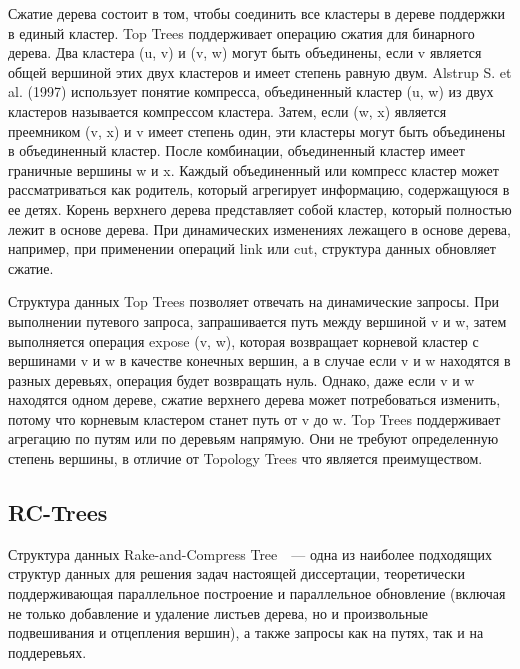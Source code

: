 \documentclass[specification,annotation]{itmo-student-thesis}
\begin{document}
Сжатие дерева состоит в том, чтобы соединить все кластеры в дереве поддержки в единый кластер. Top Trees поддерживает операцию сжатия для бинарного дерева. 
Два кластера (u, v) и (v, w) могут быть объединены, если v является общей вершиной этих двух кластеров и имеет степень равную двум. Alstrup S. et al. (1997) 
использует понятие компресса, объединенный кластер (u, w) из двух кластеров называется компрессом кластера. Затем, если (w, x) является преемником (v, x) и v 
имеет степень один, эти кластеры могут быть объединены в объединенный кластер. После комбинации, объединенный кластер имеет граничные вершины w и x. 
Каждый объединенный или компресс кластер может рассматриваться как родитель, который агрегирует информацию, содержащуюся в ее детях. Корень верхнего дерева 
представляет собой кластер, который полностью лежит в основе дерева. При динамических изменениях лежащего в основе дерева, например, при применении 
операций link или cut, структура данных обновляет сжатие.

Структура данных Top Trees позволяет отвечать на динамические запросы. При выполнении путевого запроса, запрашивается путь между вершиной v и w, 
затем выполняется операция expose (v, w), которая возвращает корневой кластер с вершинами v и w в качестве конечных вершин, а в случае если v и w находятся в 
разных деревьях, операция будет возвращать нуль. Однако, даже если v и w находятся одном дереве, сжатие верхнего дерева может потребоваться изменить, потому 
что корневым кластером станет путь от v до w. Top Trees поддерживает агрегацию по путям или по деревьям напрямую. Они не требуют определенную степень вершины, 
в отличие от Topology Trees что является преимуществом.

\subsection{RC-Trees}

Структура данных Rake-and-Compress Tree~\cite{reif94}~--- одна из наиболее подходящих структур данных для решения задач настоящей диссертации,
теоретически поддерживающая параллельное построение и параллельное обновление (включая не только добавление и удаление листьев дерева, но и произвольные
подвешивания и отцепления вершин), а также запросы как на путях, так и на поддеревьях.
\end{document}
